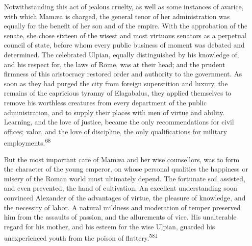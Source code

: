 


Notwithstanding this act of jealous cruelty, as well as some
instances of avarice, with which Mamæa is charged, the general
tenor of her administration was equally for the benefit of her
son and of the empire. With the approbation of the senate, she
chose sixteen of the wisest and most virtuous senators as a
perpetual council of state, before whom every public business of
moment was debated and determined. The celebrated Ulpian, equally
distinguished by his knowledge of, and his respect for, the laws
of Rome, was at their head; and the prudent firmness of this
aristocracy restored order and authority to the government. As
soon as they had purged the city from foreign superstition and
luxury, the remains of the capricious tyranny of Elagabalus, they
applied themselves to remove his worthless creatures from every
department of the public administration, and to supply their
places with men of virtue and ability. Learning, and the love of
justice, became the only recommendations for civil offices;
valor, and the love of discipline, the only qualifications for
military employments.\textsuperscript{68}


But the most important care of Mamæa and her wise counsellors,
was to form the character of the young emperor, on whose personal
qualities the happiness or misery of the Roman world must
ultimately depend. The fortunate soil assisted, and even
prevented, the hand of cultivation. An excellent understanding
soon convinced Alexander of the advantages of virtue, the
pleasure of knowledge, and the necessity of labor. A natural
mildness and moderation of temper preserved him from the assaults
of passion, and the allurements of vice. His unalterable regard
for his mother, and his esteem for the wise Ulpian, guarded his
unexperienced youth from the poison of flattery.\textsuperscript{581}

